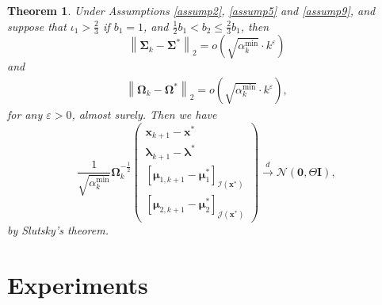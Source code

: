 \documentclass[aos]{imsart}
\numberwithin{equation}{section}
\theoremstyle{plain}
\newtheorem{theorem}{Theorem}
\begin{document}
\begin{theorem}
\label{theorem_pratical_normality}
    Under Assumptions \ref{assump2}, \ref{assump5} and  \ref{assump9}, and suppose that $\iota_1>\frac{2}{3}$ if $b_1=1$, and $\frac{1}{2} b_1 < b_2 \leq \frac{2}{3}b_1$, then 
    \begin{equation}
        \left\| \bm{\Sigma}_{k} - \bm{\Sigma}^{*} \right\|_2 = o\left( \sqrt{\alpha_k^{\text{min}}} \cdot k^{\varepsilon}\right)
    \end{equation}
    and
    \begin{equation}
        \begin{split}
             \left\| \bm{\Omega}_{k} - \bm{\Omega}^{*} \right\|_2 = o\left( \sqrt{\alpha_k^{\text{min}}} \cdot k^{\varepsilon}\right),
        \end{split}
    \end{equation}
    for any $\varepsilon > 0$, almost surely. Then we have
    \begin{equation}
        \frac{1}{\sqrt{\alpha_k^{\text{min}}}} \bm{\Omega}_k^{-\frac{1}{2}}\left( \begin{array}{c}
    \bm{x}_{k+1} - \bm{x}^{*}  \\
    \bm{\lambda}_{k+1} - \bm{\lambda}^{*} \\
    \left[ \bm{\mu}_{1,k+1} - \bm{\mu}_{1}^{*}\right]_{\mathcal{I}(\bm{x}^{*})} \\
    \left[ \bm{\mu}_{2,k+1} - \bm{\mu}_{2}^{*} \right]_{\mathcal{J}(\bm{x}^{*})} 
    \end{array} \right) \stackrel{d}{\longrightarrow} \mathcal{N} \left( \bm{0}, \Theta \bm{I}\right),
    \end{equation}
    by Slutsky's theorem. 
\end{theorem}


\section{Experiments}
\label{sec:experiments}
\end{document}
